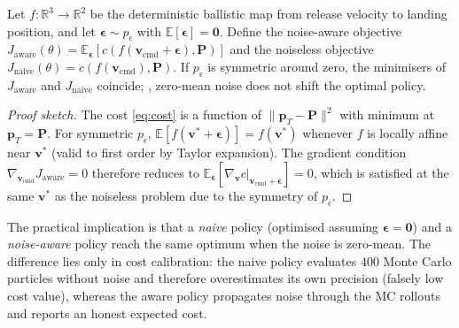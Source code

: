 \begin{proposition}
\label{prop:zeromean}
Let $f: \mathbb{R}^3 \to \mathbb{R}^2$ be the deterministic ballistic map from release
velocity to landing position, and let $\boldsymbol{\epsilon} \sim p_\epsilon$ with
$\mathbb{E}[\boldsymbol{\epsilon}] = \mathbf{0}$.
Define the noise-aware objective
$J_{\mathrm{aware}}(\theta) = \mathbb{E}_{\boldsymbol{\epsilon}}[c(f(\mathbf{v}_{\mathrm{cmd}}
+ \boldsymbol{\epsilon}), \mathbf{P})]$
and the noiseless objective
$J_{\mathrm{naive}}(\theta) = c(f(\mathbf{v}_{\mathrm{cmd}}), \mathbf{P})$.
If $p_\epsilon$ is symmetric around zero, the minimisers of $J_{\mathrm{aware}}$ and
$J_{\mathrm{naive}}$ coincide; \ie{}, zero-mean noise does not shift the optimal policy.
\end{proposition}

\begin{proof}[Proof sketch]
The cost \eqref{eq:cost} is a function of $\|\mathbf{p}_T - \mathbf{P}\|^2$ with
minimum at $\mathbf{p}_T = \mathbf{P}$.
For symmetric $p_\epsilon$, $\mathbb{E}[f(\mathbf{v}^* + \boldsymbol{\epsilon})]
= f(\mathbf{v}^*)$ whenever $f$ is locally affine near $\mathbf{v}^*$
(valid to first order by Taylor expansion).
The gradient condition
$\nabla_{\mathbf{v}_{\mathrm{cmd}}} J_{\mathrm{aware}} = 0$ therefore reduces to
$\mathbb{E}_{\boldsymbol{\epsilon}}[\nabla_{\mathbf{v}} c \big|_{\mathbf{v}_{\mathrm{cmd}}
+ \boldsymbol{\epsilon}}] = 0$, which is satisfied at the same $\mathbf{v}^*$ as the
noiseless problem due to the symmetry of $p_\epsilon$.
\end{proof}

The practical implication is that a \emph{naive} policy (optimised assuming
$\boldsymbol{\epsilon} = \mathbf{0}$) and a \emph{noise-aware} policy reach the same
optimum when the noise is zero-mean.
The difference lies only in cost calibration: the naive policy evaluates 400 Monte
Carlo particles without noise and therefore overestimates its own precision
(falsely low cost value), whereas the aware policy propagates noise through the
MC rollouts and reports an honest expected cost.

